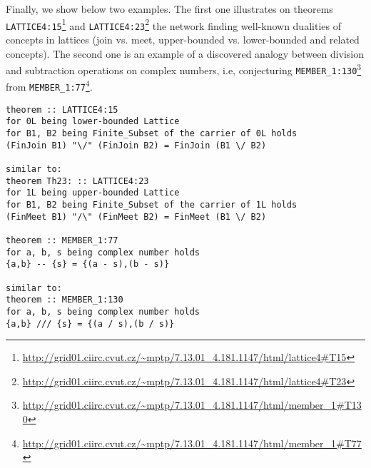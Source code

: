 \documentclass{ecai}
\begin{document}
Finally, we show below two examples. The first one illustrates on theorems 
\texttt{LATTICE4:15}\footnote{\url{http://grid01.ciirc.cvut.cz/~mptp/7.13.01_4.181.1147/html/lattice4\#T15}} and 
\texttt{LATTICE4:23}\footnote{\url{http://grid01.ciirc.cvut.cz/~mptp/7.13.01_4.181.1147/html/lattice4\#T23}}
the network finding well-known dualities of concepts in lattices (join vs. meet, upper-bounded vs. lower-bounded and related concepts). The second one is an example of a discovered analogy between division and subtraction operations on complex numbers, i.e, conjecturing 
\texttt{MEMBER\_1:130}\footnote{\url{http://grid01.ciirc.cvut.cz/~mptp/7.13.01_4.181.1147/html/member_1\#T130}} from
\texttt{MEMBER\_1:77}\footnote{\url{http://grid01.ciirc.cvut.cz/~mptp/7.13.01_4.181.1147/html/member_1\#T77}}.

\begin{lstlisting}[language=Mizar,basicstyle=\ttfamily\scriptsize]
theorem :: LATTICE4:15
for 0L being lower-bounded Lattice 
for B1, B2 being Finite_Subset of the carrier of 0L holds 
(FinJoin B1) "\/" (FinJoin B2) = FinJoin (B1 \/ B2)

similar to:
theorem Th23: :: LATTICE4:23
for 1L being upper-bounded Lattice
for B1, B2 being Finite_Subset of the carrier of 1L holds 
(FinMeet B1) "/\" (FinMeet B2) = FinMeet (B1 \/ B2)

theorem :: MEMBER_1:77
for a, b, s being complex number holds 
{a,b} -- {s} = {(a - s),(b - s)}

similar to:
theorem :: MEMBER_1:130
for a, b, s being complex number holds 
{a,b} /// {s} = {(a / s),(b / s)}
\end{lstlisting}







\end{document}
